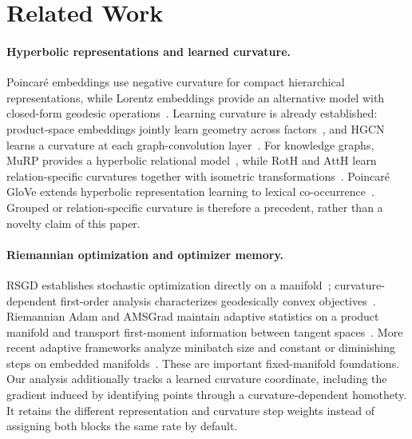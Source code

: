 \section{Related Work}
\label{sec:related-work}

\paragraph{Hyperbolic representations and learned curvature.}
Poincar\'{e} embeddings use negative curvature for compact hierarchical representations, while Lorentz embeddings provide an alternative model with closed-form geodesic operations~\citep{nickel2017poincare,nickel2018lorentz}. Learning curvature is already established: product-space embeddings jointly learn geometry across factors~\citep{gu2019mixed}, and HGCN learns a curvature at each graph-convolution layer~\citep{chami2019hgcn}. For knowledge graphs, MuRP provides a hyperbolic relational model~\citep{balazevic2019poincare}, while RotH and AttH learn relation-specific curvatures together with isometric transformations~\citep{chami2020atth}. Poincar\'{e} GloVe extends hyperbolic representation learning to lexical co-occurrence~\citep{tifrea2019poincare}. Grouped or relation-specific curvature is therefore a precedent, rather than a novelty claim of this paper.

\paragraph{Riemannian optimization and optimizer memory.}
RSGD establishes stochastic optimization directly on a manifold~\citep{bonnabel2013sgd}; curvature-dependent first-order analysis characterizes geodesically convex objectives~\citep{zhang2016geodesic}. Riemannian Adam and AMSGrad maintain adaptive statistics on a product manifold and transport first-moment information between tangent spaces~\citep{becigneul2019radam}. More recent adaptive frameworks analyze minibatch size and constant or diminishing steps on embedded manifolds~\citep{sakai2024adaptive}. These are important fixed-manifold foundations. Our analysis additionally tracks a learned curvature coordinate, including the gradient induced by identifying points through a curvature-dependent homothety. It retains the different representation and curvature step weights instead of assigning both blocks the same rate by default.

